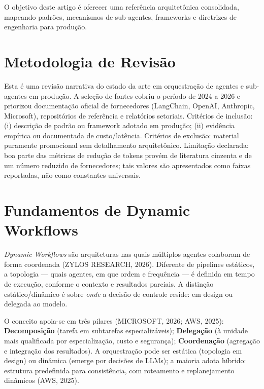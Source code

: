\documentclass[12pt,a4paper]{article}
\begin{document}
O objetivo deste artigo é oferecer uma referência arquitetônica consolidada, mapeando padrões, mecanismos de sub-agentes, frameworks e diretrizes de engenharia para produção.



\section{Metodologia de Revisão}

Esta é uma revisão narrativa do estado da arte em orquestração de agentes e sub-agentes em produção. A seleção de fontes cobriu o período de 2024 a 2026 e priorizou documentação oficial de fornecedores (LangChain, OpenAI, Anthropic, Microsoft), repositórios de referência e relatórios setoriais. Critérios de inclusão: (i) descrição de padrão ou framework adotado em produção; (ii) evidência empírica ou documentada de custo/latência. Critérios de exclusão: material puramente promocional sem detalhamento arquitetônico. Limitação declarada: boa parte das métricas de redução de tokens provém de literatura cinzenta e de um número reduzido de fornecedores; tais valores são apresentados como faixas reportadas, não como constantes universais.
\section{Fundamentos de Dynamic Workflows}

\textit{Dynamic Workflows} são arquiteturas nas quais múltiplos agentes colaboram de forma coordenada (ZYLOS RESEARCH, 2026). Diferente de pipelines estáticos, a topologia — quais agentes, em que ordem e frequência — é definida em tempo de execução, conforme o contexto e resultados parciais. A distinção estático/dinâmico é sobre \textit{onde} a decisão de controle reside: em design ou delegada ao modelo.

O conceito apoia-se em três pilares (MICROSOFT, 2026; AWS, 2025): \textbf{Decomposição} (tarefa em subtarefas especializáveis); \textbf{Delegação} (à unidade mais qualificada por especialização, custo e segurança); \textbf{Coordenação} (agregação e integração dos resultados). A orquestração pode ser estática (topologia em design) ou dinâmica (emerge por decisões de LLMs); a maioria adota híbrido: estrutura predefinida para consistência, com roteamento e replanejamento dinâmicos (AWS, 2025).
\end{document}
